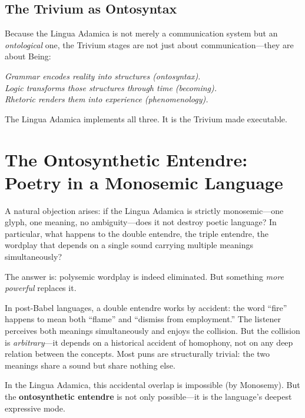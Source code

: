 \documentclass[12pt, letterpaper]{book}
\begin{document}
\subsection{The Trivium as Ontosyntax}

Because the Lingua Adamica is not merely a communication system but an \textit{ontological} one, the Trivium stages are not just about communication---they are about Being:

\begin{center}
\textit{Grammar encodes reality into structures (ontosyntax).\\
Logic transforms those structures through time (becoming).\\
Rhetoric renders them into experience (phenomenology).}
\end{center}

The Lingua Adamica implements all three. It is the Trivium made executable.


\section[The Ontosynthetic Entendre]{The Ontosynthetic Entendre:\\ Poetry in a Monosemic Language}

A natural objection arises: if the Lingua Adamica is strictly monosemic---one glyph, one meaning, no ambiguity---does it not destroy poetic language? In particular, what happens to the double entendre, the triple entendre, the wordplay that depends on a single sound carrying multiple meanings simultaneously?

The answer is: polysemic wordplay is indeed eliminated. But something \textit{more powerful} replaces it.

In post-Babel languages, a double entendre works by accident: the word ``fire'' happens to mean both ``flame'' and ``dismiss from employment.'' The listener perceives both meanings simultaneously and enjoys the collision. But the collision is \textit{arbitrary}---it depends on a historical accident of homophony, not on any deep relation between the concepts. Most puns are structurally trivial: the two meanings share a sound but share nothing else.

In the Lingua Adamica, this accidental overlap is impossible (by Monosemy). But the \textbf{ontosynthetic entendre} is not only possible---it is the language's deepest expressive mode.
\end{document}
